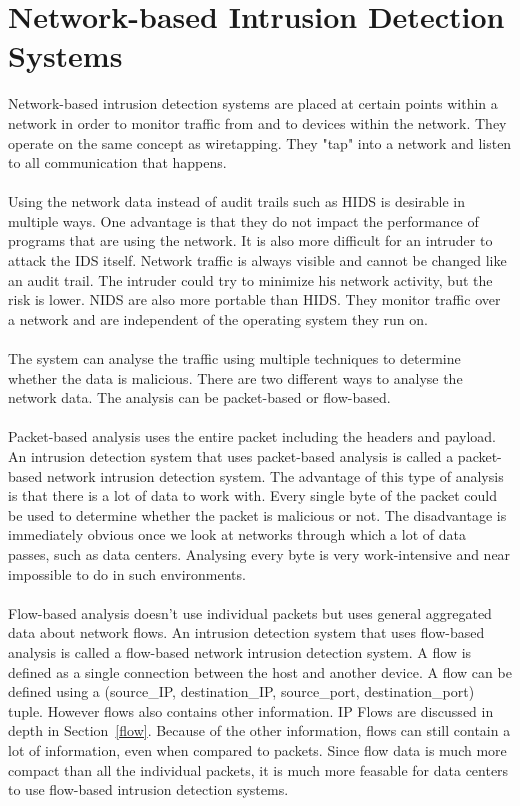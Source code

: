 \section{Network-based Intrusion Detection Systems}
Network-based intrusion detection systems are placed at certain points within a network in order to monitor traffic from and to devices within the network. They operate on the same concept as wiretapping. They "tap" into a network and listen to all communication that happens.  \cite{sans} \\
\\
Using the network data instead of audit trails such as HIDS is desirable in multiple ways. One advantage is that they do not impact the performance of programs that are using the network. It is also more difficult for an intruder to attack the IDS itself. Network traffic is always visible and cannot be changed like an audit trail. The intruder could try to minimize his network activity, but the risk is lower. NIDS are also more portable than HIDS. They monitor traffic over a network and are independent of the operating system they run on.  \cite{Bace:1999:ID:347487} \\
\\
The system can analyse the traffic using multiple techniques to determine whether the data is malicious. There are two different ways to analyse the network data. The analysis can be packet-based or flow-based.\\
\\
Packet-based analysis uses the entire packet including the headers and payload. An intrusion detection system that uses packet-based analysis is called a packet-based network intrusion detection system. The advantage of this type of analysis is that there is a lot of data to work with. Every single byte of the packet could be used to determine whether the packet is malicious or not. The disadvantage is immediately obvious once we look at networks through which a lot of data passes, such as data centers. Analysing every byte is very work-intensive and near impossible to do in such environments. \cite{alaidaros2011overview} \\
\\
Flow-based analysis doesn't use individual packets but uses general aggregated data about network flows. An intrusion detection system that uses flow-based analysis is called a flow-based network intrusion detection system. A flow is defined as a single connection between the host and another device. A flow can be defined using a (source\_IP, destination\_IP, source\_port, destination\_port) tuple. However flows also contains other information. IP Flows are discussed in depth in Section~\ref{flow}. Because of the other information, flows can still contain a lot of information, even when compared to packets. Since flow data is much more compact than all the individual packets, it is much more feasable for data centers to use flow-based intrusion detection systems. \cite{alaidaros2011overview} \cite{pao2004netflow}

